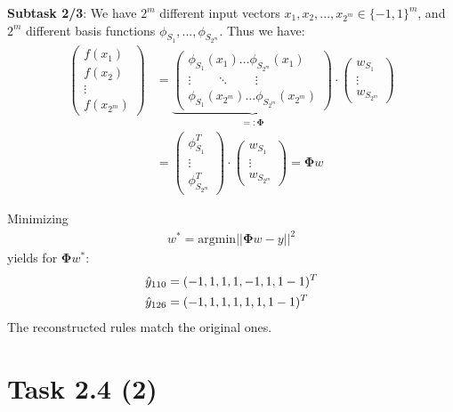 \documentclass{beamer}
\begin{document}
\begin{frame}
	\textbf{Subtask 2/3}:
	We have $2^m$ different input vectors $x_1,x_2,...,x_{2^m} \in \{-1,1\}^m$, and
	$2^m$ different basis functions $\phi_{S_1},...,\phi_{S_{2^m}}$.
	Thus we have:
	\begin{align*}
		\left(\begin{matrix}
		f(x_1)\\
		f(x_2)\\
		\vdots\\
		f(x_{2^m})
		\end{matrix}\right) &= 
		\underbrace{\left(\begin{matrix}
		\phi_{S_1}(x_1) \dots \phi_{S_{2^m}}(x_1)\\
		\vdots\qquad \ddots\qquad \vdots\\
		\phi_{S_1}(x_{2^m}) \dots \phi_{S_{2^m}}(x_{2^m})
		\end{matrix}\right) }_{=:\mathbf{\Phi}}\cdot
		\left(\begin{matrix}
		w_{S_1}\\
		\vdots\\
		w_{S_{2^m}}
		\end{matrix}\right) \\&=
		\left(\begin{matrix}
		\phi_{S_1}^T\\
		\vdots \\
		\phi_{S_{2^m}}^T
		\end{matrix}\right)\cdot
		\left(\begin{matrix}
		w_{S_1}\\
		\vdots\\
		w_{S_{2^m}}
		\end{matrix}\right)
		 = \mathbf{\Phi} w
	\end{align*}	
\end{frame}

\begin{frame}
Minimizing
	\begin{align*}
	w^* = \text{argmin}||\mathbf{\Phi} w - y||^2	
	\end{align*}
	yields for $\mathbf{\mathbf{\Phi}}w^*$:
	\begin{align*}
	\hat{y}_{110} &= (-1,1,1,1,-1,1,1-1)^T \\\bigskip
	\hat{y}_{126} &=  (-1,1,1,1,1,1,1-1)^T
	\end{align*}
	The reconstructed rules match the original ones.
\end{frame}

\section{Task 2.4 (2)}
\end{document}

